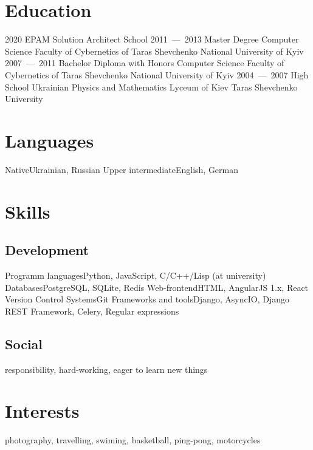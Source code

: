 \documentclass[11pt,a4paper,oneside,colorlinks]{moderncv}
\begin{document}
    \section{Education}
        \cventry
            {2020}
            {EPAM}{}
            {Solution Architect School}
            {}{}
        \cventry
            {2011~---~2013}
            {Master Degree}
            {Computer Science}
            {Faculty of Cybernetics of Taras Shevchenko National University of Kyiv}
            {}{}
        \cventry
            {2007~---~2011}
            {Bachelor Diploma with Honors}
            {Computer Science}
            {Faculty of Cybernetics of Taras Shevchenko National University of Kyiv}
            {}{}
        \cventry
            {2004~---~2007}
            {High School}{}
            {Ukrainian Physics and Mathematics Lyceum of Kiev Taras Shevchenko University}
            {}{}

    \section{Languages}
        \cvline
            {Native}{Ukrainian, Russian}
        \cvline
            {Upper intermediate}{English, German}

    \section{Skills}
        \subsection{Development}
            \cvline
                {Programm languages}{Python, JavaScript, C/C++/Lisp (at university)}
            \cvline
                {Databases}{PostgreSQL, SQLite, Redis}
            \cvline
                {Web-frontend}{HTML, AngularJS 1.x, React}
            \cvline
                {Version Control Systems}{Git}
            \cvline
                {Frameworks and tools}{Django, AsyncIO, Django REST Framework, Celery, Regular expressions}
        \subsection{Social}
            \cvline
                {}{responsibility, hard-working, eager to learn new things}

    \section{Interests}
        \cvline
            {}{photography, travelling, swiming, basketball, ping-pong, motorcycles}
\end{document}
